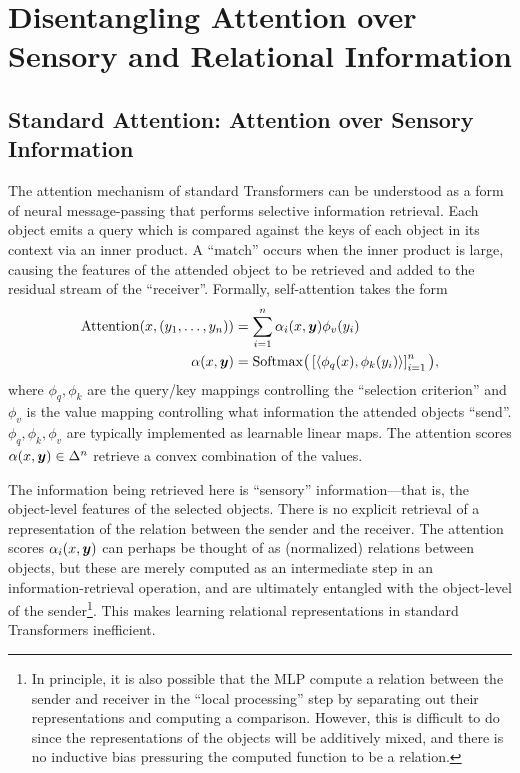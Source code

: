 \section{Disentangling Attention over Sensory and Relational Information}

\subsection{Standard Attention: Attention over Sensory Information}

The attention mechanism of standard Transformers can be understood as a form of neural message-passing that performs selective information retrieval. Each object emits a query which is compared against the keys of each object in its context via an inner product. A ``match'' occurs when the inner product is large, causing the features of the attended object to be retrieved and added to the residual stream of the ``receiver''. Formally, self-attention takes the form
\begin{equation}\label{eq:self_attn}
  \begin{split}
    \mathrm{Attention}(x, (y_1, \ldots, y_n)) &= \sum_{i=1}^{n} \alpha_i(x, \bm{y}) \phi_v(y_i) \\
    \alpha(x, \bm{y}) &= \mathrm{Softmax}\big(\left[\left \langle \phi_q(x), \phi_k(y_i) \right\rangle\right]_{i=1}^{n}\big),
  \end{split}
\end{equation}
where $\phi_q,\phi_k$ are the query/key mappings controlling the ``selection criterion'' and $\phi_v$ is the value mapping controlling what information the attended objects ``send''. $\phi_q, \phi_k, \phi_v$ are typically implemented as learnable linear maps. The attention scores $\alpha(x, \bm{y}) \in \Delta^n$ retrieve a convex combination of the values.

The information being retrieved here is ``sensory'' information---that is, the object-level features of the selected objects. There is no explicit retrieval of a representation of the relation between the sender and the receiver. The attention scores $\alpha_i(x, \bm{y})$ can perhaps be thought of as (normalized) relations between objects, but these are merely computed as an intermediate step in an information-retrieval operation, and are ultimately entangled with the object-level of the sender\footnote{In principle, it is also possible that the MLP compute a relation between the sender and receiver in the ``local processing'' step by separating out their representations and computing a comparison. However, this is difficult to do since the representations of the objects will be additively mixed, and there is no inductive bias pressuring the computed function to be a relation.}. This makes learning relational representations in standard Transformers inefficient.

